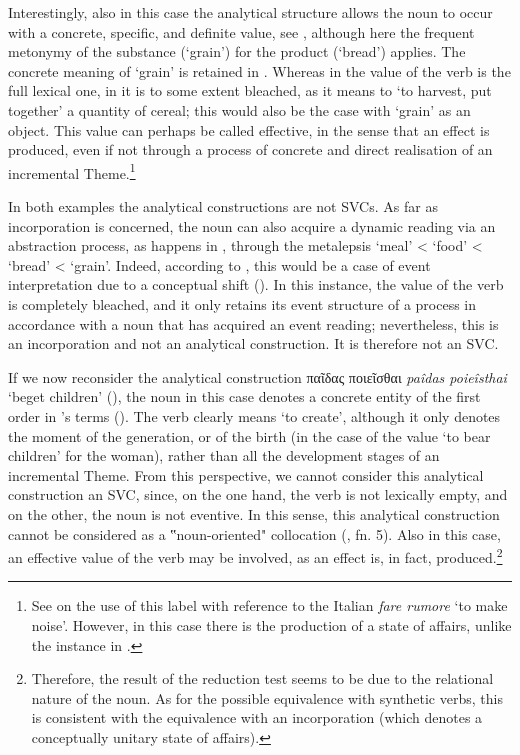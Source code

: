 \documentclass[output=paper,colorlinks,citecolor=brown]{langscibook}
\begin{document}
Interestingly, also in this case the analytical structure allows the noun to occur with a concrete, specific, and definite value, see , although here the frequent metonymy of the substance (`grain') for the product (`bread') applies. The concrete meaning of `grain' is retained in . Whereas in  the value of the verb is the full lexical one, in  it is to some extent bleached, as it means to `to harvest, put together' a quantity of cereal; this would also be the case with `grain' as an object. This value can perhaps be called effective, in the sense that an effect is produced, even if not through a process of concrete and direct realisation of an incremental Theme.\footnote{See \citet[140]{Pompei2023} on the use of this label with reference to the Italian \textit{fare rumore} `to make noise'. However, in this case there is the production of a state of affairs, unlike the instance in .} 


In both examples the analytical constructions are not SVCs. As far as incorporation is concerned, the noun can also acquire a dynamic reading via an abstraction process, as happens in , through the metalepsis `meal' < `food' < `bread' < `grain'. Indeed, according to \citet{GrossKiefer1995}, this would be a case of event interpretation due to a conceptual shift (). In this instance, the value of the verb is completely bleached, and it only retains its event structure of a process in accordance with a noun that has acquired an event reading; nevertheless, this is an incorporation and not an analytical construction. It is therefore not an SVC.
\largerpage[1.5]

If we now reconsider the analytical construction παῖδας ποιεῖσθαι \textit{paîdas poieî\-sthai} `beget children' (), the noun in this case denotes a concrete entity of the first order in \citeauthor{Lyons1977}'s terms (\citeyear[443]{Lyons1977}). The verb clearly means `to create', although it only denotes the moment of the generation, or of the birth (in the case of the value `to bear children' for the woman), rather than all the development stages of an incremental Theme. From this perspective, we cannot consider this analytical construction an SVC, since, on the one hand, the verb is not lexically empty, and on the other, the noun is not eventive. In this sense, this analytical construction cannot be considered as a ‟noun-oriented" collocation (, fn. 5). Also in this case, an effective value of the verb may be involved, as an effect is, in fact, produced.\footnote{Therefore, the result of the reduction test seems to be due to the relational nature of the noun. As for the possible equivalence with synthetic verbs, this is consistent with the equivalence with an incorporation (which denotes a conceptually unitary state of affairs).}
\end{document}
